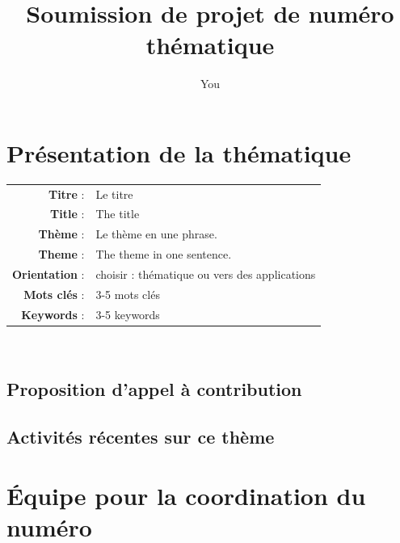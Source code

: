 \documentclass{article}
\author{You}
\title{Soumission de projet de numéro thématique}
\newcommand{\titreproposefr}{Le titre}
\newcommand{\titreproposeen}{The title}
\newcommand{\themefr}{Le thème en une phrase.}
\newcommand{\themeen}{The theme in one sentence.}
\begin{document}
\maketitle



\section{Présentation de la thématique}

\begin{tabular}{|rp{10cm}|}
\hline
\textbf{Titre} : & \titreproposefr \\
\textbf{Title} : & \titreproposeen\\
\hline
\textbf{Thème} :& \themefr\\
\textbf{Theme} :& \themeen\\
\hline
\textbf{Orientation} : & choisir : thématique ou vers des applications  \\
\hline
\textbf{Mots clés} : & 3-5 mots clés \\
\textbf{Keywords} : & 3-5 keywords \\
\hline

\end{tabular}
\\



\subsection{Proposition d'appel à contribution}


\lipsum[1-2]


\subsection{Activités récentes sur ce thème}

\lipsum[1]

\section{Équipe pour la coordination du numéro}
\end{document}

